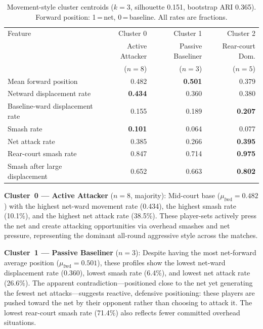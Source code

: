 \begin{table}[h]
  \caption{Movement-style cluster centroids ($k=3$, silhouette 0.151, bootstrap ARI 0.365).
           Forward position: 1\,=\,net, 0\,=\,baseline. All rates are fractions.}
  \label{tab:movement_clusters}
  \centering
  \small
  \begin{tabular}{lrrr}
    \toprule
    Feature & Cluster 0 & Cluster 1 & Cluster 2 \\
            & Active Attacker & Passive Baseliner & Rear-court Dom. \\
            & ($n=8$) & ($n=3$) & ($n=5$) \\
    \midrule
    Mean forward position         & 0.482 & \textbf{0.501} & 0.379 \\
    Netward displacement rate     & \textbf{0.434} & 0.360 & 0.380 \\
    Baseline-ward displacement rate & 0.155 & 0.189 & \textbf{0.207} \\
    Smash rate                    & \textbf{0.101} & 0.064 & 0.077 \\
    Net attack rate               & 0.385 & 0.266 & \textbf{0.395} \\
    Rear-court smash rate         & 0.847 & 0.714 & \textbf{0.975} \\
    Smash after large displacement & 0.652 & 0.663 & \textbf{0.802} \\
    \bottomrule
  \end{tabular}
\end{table}

\textbf{Cluster~0 --- Active Attacker} ($n=8$, majority): Mid-court base
($\mu_\text{fwd}=0.482$) with the highest net-ward movement rate (0.434),
the highest smash rate (10.1\%), and the highest net attack rate (38.5\%).
These player-sets actively press the net and create attacking opportunities
via overhead smashes and net pressure, representing the dominant all-round
aggressive style across the matches.

\textbf{Cluster~1 --- Passive Baseliner} ($n=3$): Despite having the most
net-forward average position ($\mu_\text{fwd}=0.501$), these profiles show
the lowest net-ward displacement rate (0.360), lowest smash rate (6.4\%), and
lowest net attack rate (26.6\%). The apparent contradiction---positioned close
to the net yet generating the fewest net attacks---suggests reactive, defensive
positioning: these players are pushed toward the net by their opponent rather
than choosing to attack it. The lowest rear-court smash rate (71.4\%) also
reflects fewer committed overhead situations.

